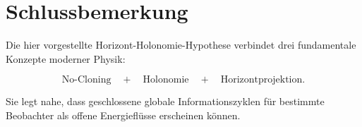 \documentclass[11pt,a4paper]{article}
\begin{document}
	\section*{Schlussbemerkung}
	
	Die hier vorgestellte Horizont-Holonomie-Hypothese verbindet drei fundamentale Konzepte moderner Physik:
	
	\[
	\text{No-Cloning}
	\quad+\quad
	\text{Holonomie}
	\quad+\quad
	\text{Horizontprojektion}.
	\]
	
	Sie legt nahe, dass geschlossene globale Informationszyklen für bestimmte Beobachter als offene Energieflüsse erscheinen können.
	
\end{document}
